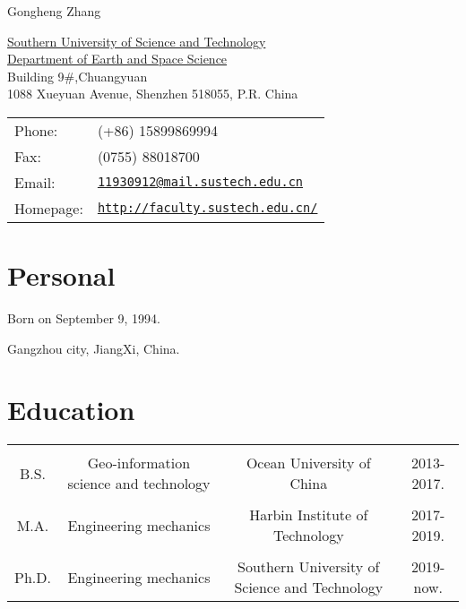 \documentclass[letterpaper]{article}
\def\name{Gongheng Zhang}
\renewenvironment{itemize}{
  \begin{list}{}{
    \setlength{\leftmargin}{1.5em}
  }
}{
  \end{list}
}
\begin{document}
{\huge \name}


\vspace{0.25in}

\begin{minipage}{0.55\linewidth}
  \href{https://www.sustech.edu.cn/}{Southern University of Science and Technology} \\ 
  \href{http://ess.sustc.edu.cn/}{Department of Earth and Space Science} \\
  Building 9\#,Chuangyuan\\
  1088 Xueyuan Avenue, Shenzhen 518055, P.R. China
\end{minipage}
\begin{minipage}{0.4\linewidth}
  \begin{tabular}{ll}
    Phone: & (+86) 15899869994 \\
    Fax: &  (0755) 88018700 \\
    Email: & \href{mailto:11930912@mail.sustech.edu.cn}{\tt 11930912@mail.sustech.edu.cn} \\
    Homepage: & \href{http://faculty.sustech.edu.cn/}{\tt http://faculty.sustech.edu.cn/} \\
  \end{tabular}
\end{minipage}


\section*{Personal}

\begin{itemize}
\item Born on September 9, 1994.
\item Gangzhou city, JiangXi, China.
\end{itemize}


\section*{Education}
\begin{table}[htbp]
	\centering  %
	\label{table1}  %
	\begin{tabular}{ c c c c }
		& & & \\[-6pt]  %
		B.S.& Geo-information science and technology & Ocean University of China & 2013-2017. \\  
		& & & \\[-6pt]  %
		M.A.& Engineering mechanics & Harbin Institute of Technology & 2017-2019. \\
		& & & \\[-6pt]  %
		Ph.D.& Engineering mechanics & Southern University of Science and Technology & 2019-now.		
		
		
	\end{tabular}
\end{table}
\end{document}
